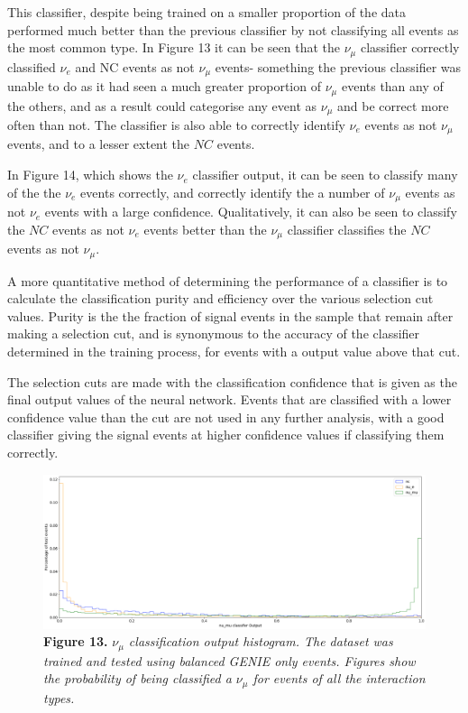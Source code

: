 \noindent This classifier, despite being trained on a smaller proportion of the data performed much better than the previous classifier by not classifying all events as the most common type.  In Figure 13 it can be seen that the $\nu_\mu$ classifier correctly classified $\nu_e$ and NC events as not $\nu_\mu$ events- something the previous classifier was unable to do as it had seen a much greater proportion of $\nu_\mu$ events than any of the others, and as a result could categorise any event as $\nu_\mu$ and be correct more often than not. The classifier is also able to correctly identify $\nu_e$ events as not $\nu_\mu$ events, and to a lesser extent the $NC$ events. \medskip

\noindent In Figure 14, which shows the $\nu_e$ classifier output, it can be seen to classify many of the the $\nu_e$ events correctly, and correctly identify the a number of $\nu_\mu$ events as not $\nu_e$ events with a large confidence. Qualitatively, it can also be seen to classify the $NC$ events as not $\nu_e$ events better than the $\nu_\mu$ classifier classifies the $NC$ events as not $\nu_\mu$. \medskip

\noindent A more quantitative method of determining the performance of a classifier is to calculate the classification purity and efficiency over the various selection cut values. Purity is the the fraction of signal events in the sample that remain after making a selection cut, and is synonymous to the accuracy of the classifier determined in the training process, for events with a output value above that cut. \medskip

\noindent The selection cuts are made with the classification confidence that is given as the final output values of the neural network. Events that are classified with a lower confidence value than the cut are not used in any further analysis, with a good classifier giving the signal events at higher confidence values if classifying them correctly. \medskip

\begin{figure}[t!]
 \centering
 \includegraphics[width=160mm]{genie/bal_genie/bal_genie_mu.png}
 \textbf{Figure 13.} \textit{$\nu_\mu$ classification output histogram. The dataset was trained and tested using balanced GENIE only events. Figures show the probability of being classified a $\nu_\mu$ for events of all the interaction types.}
\end{figure}

